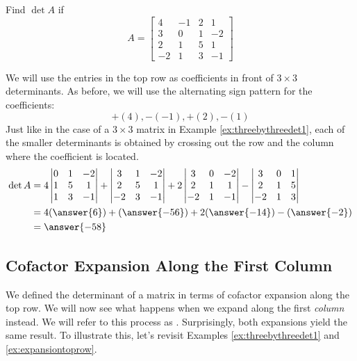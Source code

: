 \documentclass{ximera}
\begin{document}
\begin{example}\label{ex:expansiontoprow}
Find $\det{A}$ if 
$$A=\begin{bmatrix}4&-1&2&1\\3&0&1&-2\\
2&1&5&1\\-2&1&3&-1\end{bmatrix}$$
\begin{explanation}
We will use the entries in the top row as coefficients in front of $3\times 3$ determinants.  As before, we will use the alternating sign pattern for the coefficients:
$$+(4), -(-1), +(2), -(1)$$
Just like in the case of a $3 \times 3$ matrix in Example \ref{ex:threebythreedet1}, each of the smaller determinants is obtained by crossing out the row and the column where the coefficient is located.
\begin{align*}
\det{A}
&=4\begin{vmatrix}0&1&-2\\1&5&1\\1&3&-1\end{vmatrix}+\begin{vmatrix}3&1&-2\\2&5&1\\-2&3&-1\end{vmatrix}+2\begin{vmatrix}3&0&-2\\2&1&1\\-2&1&-1\end{vmatrix}-\begin{vmatrix}3&0&1\\2&1&5\\-2&1&3\end{vmatrix}\\&=4(\answer{6})+(\answer{-56})+2(\answer{-14})-(\answer{-2})\\
&=\answer{-58}
\end{align*}
\end{explanation}
\end{example}

\subsection*{Cofactor Expansion Along the First Column}
We defined the determinant of a matrix in terms of cofactor expansion along the top row.  We will now see what happens when we expand along the first \textit{column} instead.  We will refer to this process as .  Surprisingly, both expansions yield the same result.  To illustrate this, let's revisit Examples \ref{ex:threebythreedet1} and \ref{ex:expansiontoprow}. 
\end{document}
